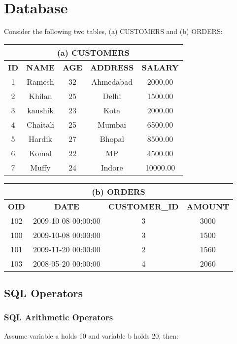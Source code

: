 \chapter{Database}

Consider the following two tables, (a) CUSTOMERS and (b) ORDERS:

\begin{center}
	\begin{tabular}{|c|c|c|c|c|}
		\multicolumn{5}{c}{(a) CUSTOMERS}\\
		\hline
		{\textbf{ID}} & {\textbf{NAME}} & {\textbf{AGE}} & {\textbf{ADDRESS}} & {\textbf{SALARY}} \\
		\hline
		1 & Ramesh	& 32 & Ahmedabad 	& 2000.00 \\
		2 & Khilan	& 25 & Delhi		& 1500.00 \\
		3 & kaushik	& 23 & Kota			& 2000.00 \\
		4 & Chaitali	& 25 & Mumbai	& 6500.00 \\
		5 & Hardik	& 27 & Bhopal		& 8500.00 \\
		6 & Komal	& 22 & MP			& 4500.00  \\
		7 & Muffy	& 24 & Indore		& 10000.00 \\
		\hline
	\end{tabular}
	\begin{tabular}{|c|c|c|c|}
		\multicolumn{4}{c}{(b) ORDERS}\\
		\hline
		{\textbf{OID}} & {\textbf{DATE}} & {\textbf{CUSTOMER_ID}} & {\textbf{AMOUNT}} \\
		\hline
		102 & 2009-10-08 00:00:00 &           3 &   3000 \\
		100 & 2009-10-08 00:00:00 &           3 &   1500 \\
		101 & 2009-11-20 00:00:00 &           2 &   1560 \\
		103 & 2008-05-20 00:00:00 &           4 &   2060 \\
		\hline
	\end{tabular}
\end{center}

\section{SQL Operators}
\subsection{SQL Arithmetic Operators}

Assume variable a holds 10 and variable b holds 20, then:

